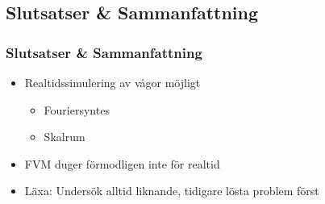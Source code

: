 \subsection{Slutsatser \& Sammanfattning}

\begin{frame}[<+(1)->]
\frametitle{Slutsatser \& Sammanfattning}

\begin{itemize}
\item Realtidssimulering av vågor möjligt
    \begin{itemize}
    \item Fouriersyntes
    \item Skalrum
    \end{itemize}
\item FVM duger förmodligen inte för realtid
\item Läxa: Undersök alltid liknande, tidigare lösta problem först
\end{itemize}

\end{frame}

